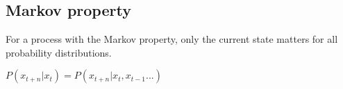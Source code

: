 
\subsection{Markov property}

For a process with the Markov property, only the current state matters for all probability distributions.

\(P(x_{t+n}|x_t)=P(x_{t+n}|x_t, x_{t-1}...)\)

